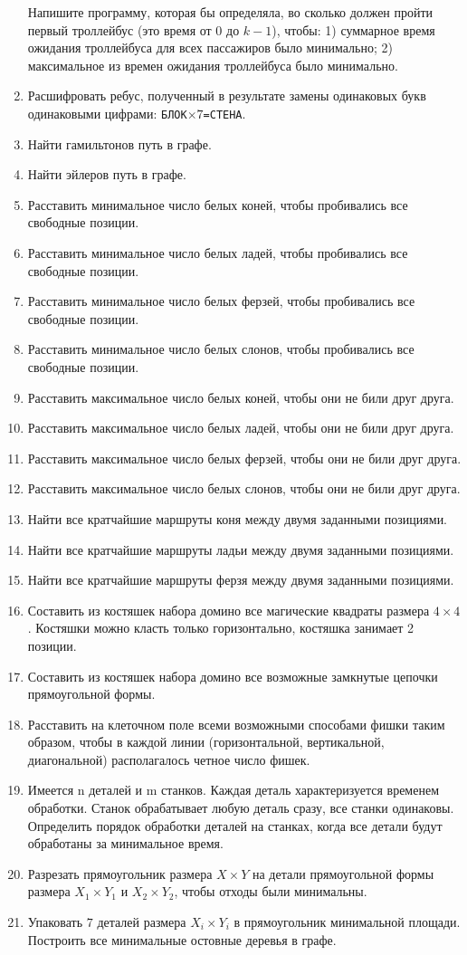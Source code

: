 \documentclass[12pt, openany, twoside]{book} %
\begin{document}
\begin{enumerate}
Напишите программу, которая бы определяла, во сколько должен пройти
первый троллейбус (это время от $0$ до $k-1$), чтобы:
1) суммарное время ожидания троллейбуса для всех пассажиров было минимально;
2) максимальное из времен ожидания троллейбуса было минимально.
\item Расшифровать ребус, полученный в результате замены одинаковых букв
одинаковыми цифрами: \texttt{БЛОК$\times 7$=СТЕНА}.
\item Найти гамильтонов путь в графе.
\item Найти эйлеров путь в графе.
\item Расставить минимальное число белых коней, чтобы пробивались все свободные позиции.
\item Расставить минимальное число белых ладей, чтобы пробивались все свободные позиции.
\item Расставить минимальное число белых ферзей, чтобы пробивались все свободные позиции.
\item Расставить минимальное число белых слонов, чтобы пробивались все свободные позиции.
\item Расставить максимальное число белых коней, чтобы они не били друг друга.
\item Расставить максимальное число белых ладей, чтобы они не били друг друга.
\item Расставить максимальное число белых ферзей, чтобы они не били друг друга.
\item Расставить максимальное число белых слонов, чтобы они не били друг друга.
\item Найти все кратчайшие маршруты коня между двумя заданными позициями.
\item Найти все кратчайшие маршруты ладьи между двумя заданными позициями.
\item Найти все кратчайшие маршруты ферзя между двумя заданными позициями.
\item Составить из костяшек набора домино все магические квадраты размера $4\times 4$. Костяшки можно класть только горизонтально, костяшка занимает 2 позиции.
\item Составить из костяшек набора домино все возможные замкнутые цепочки прямоугольной формы.
\item Расставить на клеточном поле всеми возможными способами фишки таким образом, чтобы в каждой линии (горизонтальной, вертикальной, диагональной) располагалось четное число фишек.
\item Имеется n деталей и m станков. Каждая деталь характеризуется временем обработки. Станок обрабатывает любую деталь сразу, все станки одинаковы. Определить порядок обработки деталей на станках, когда все детали будут обработаны за минимальное время.
\item Разрезать прямоугольник размера $X\times Y$ на детали прямоугольной формы размера $X_1\times Y_1$ и $X_2 \times Y_2$, чтобы отходы были минимальны.
\item Упаковать $7$ деталей размера $X_i \times Y_i$ в прямоугольник минимальной площади.
Построить все минимальные остовные деревья в графе.
\end{enumerate}
\end{document}
